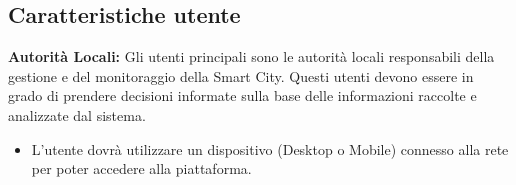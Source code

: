 \subsection{Caratteristiche utente}
\textbf{Autorità Locali:} Gli utenti principali sono le autorità locali responsabili della gestione e del monitoraggio della Smart City. Questi utenti devono essere in grado di prendere decisioni informate sulla base delle informazioni raccolte e analizzate dal sistema.
\begin{itemize}
    \item L'utente dovrà utilizzare un dispositivo (Desktop o Mobile) connesso alla rete per poter accedere alla piattaforma.
\end{itemize}
